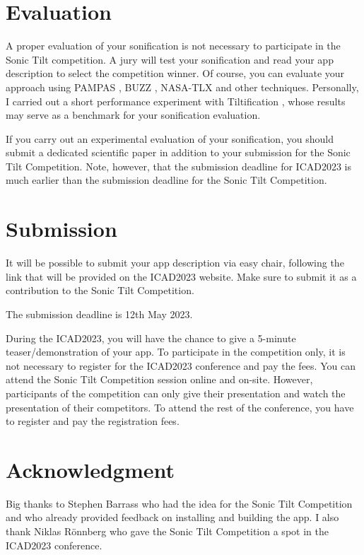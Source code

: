 \documentclass[a4paper,10pt,oneside]{article}
\begin{document}
\begin{sloppy}
\section{Evaluation}
\label{sec:typestyle}

A proper evaluation of your sonification is not necessary to participate in the Sonic Tilt competition. A jury will test your sonification and read your app description to select the competition winner. Of course, you can evaluate your approach using PAMPAS \cite{pampas}, BUZZ \cite{buzz}, NASA-TLX \cite{nasaoriginal} and other techniques. Personally, I carried out a short performance experiment with Tiltification \cite{isontable}, whose results may serve as a benchmark for your sonification evaluation.

If you carry out an experimental evaluation of your sonification, you should submit a dedicated scientific paper in addition to your submission for the Sonic Tilt Competition. Note, however, that the submission deadline for ICAD2023 is much earlier than the submission deadline for the Sonic Tilt Competition. 

\section{Submission}
It will be possible to submit your app description via easy chair, following the link that will be provided on the ICAD2023 website. Make sure to submit it as a contribution to the Sonic Tilt Competition.

The submission deadline is 12th May 2023.

During the ICAD2023, you will have the chance to give a 5-minute teaser/demonstration of your app. To participate in the competition only, it is not necessary to register for the ICAD2023 conference and pay the fees. You can attend the Sonic Tilt Competition session online and on-site. However, participants of the competition can only give their presentation and watch the presentation of their competitors. To attend the rest of the conference, you have to register and pay the registration fees.

\section{Acknowledgment}
\label{sec:ack}
Big thanks to Stephen Barrass who had the idea for the Sonic Tilt Competition and who already provided feedback on installing and building the app. I also thank Niklas Rönnberg who gave the Sonic Tilt Competition a spot in the ICAD2023 conference.


\end{sloppy}
\end{document}

